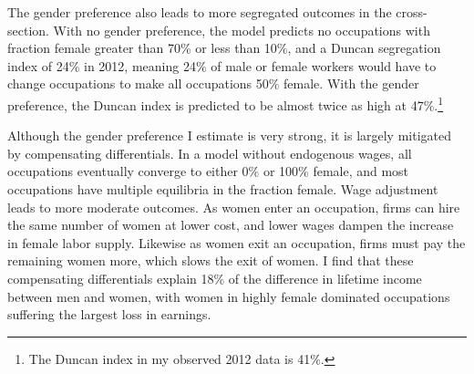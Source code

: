 \documentclass[11pt]{article}
\begin{document}



The gender preference also leads to more segregated outcomes in the cross-section. With no gender preference, the model predicts no occupations with fraction female greater than 70\% or less than 10\%, and a Duncan segregation index of 24\% in 2012, meaning 24\% of male or female workers would have to change occupations to make all occupations 50\% female. With the gender preference, the Duncan index is predicted to be almost twice as high at 47\%.\footnote{The Duncan index in my observed 2012 data is 41\%.}





Although the gender preference I estimate is very strong, it is largely mitigated by compensating differentials. In a model without endogenous wages, all occupations eventually converge to either 0\% or 100\% female, and most occupations have multiple equilibria in the fraction female. Wage adjustment leads to more moderate outcomes. As women enter an occupation, firms can hire the same number of women at lower cost, and lower wages dampen the increase in female labor supply. Likewise as women exit an occupation, firms must pay the remaining women more, which slows the exit of women. I find that these compensating differentials explain 18\% of the difference in lifetime income between men and women, with women in highly female dominated occupations suffering the largest loss in earnings. 



\end{document}
